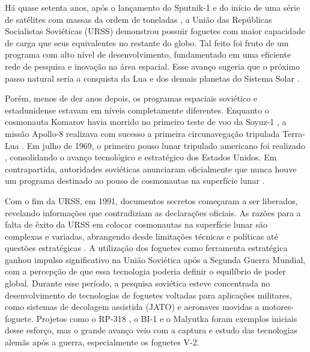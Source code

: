 Há quase setenta anos, após o lançamento do Sputnik-1 \citep{nasa1957} e do início de uma série de satélites com massas da ordem de toneladas \citep{sputnik3}, a União das Repúblicas Socialistas Soviéticas (URSS) demonstrou possuir foguetes com maior capacidade de carga que seus equivalentes no restante do globo. Tal feito foi fruto de um programa com alto nível de desenvolvimento, fundamentado em uma eficiente rede de pesquisa e inovação na área espacial. Esse avanço sugeria que o próximo passo natural seria a conquista da Lua e dos demais planetas do Sistema Solar \citep{betzler2024}.

Porém, menos de dez anos depois, os programas espaciais soviético e estadunidense estavam em níveis completamente diferentes. Enquanto o cosmonauta Komarov havia morrido no primeiro teste de voo da Soyuz-1 \citep{zak2018}, a missão Apollo-8 realizava com sucesso a primeira circunavegação tripulada Terra-Lua \citep{nasaApollo8}. Em julho de 1969, o primeiro pouso lunar tripulado americano foi realizado \citep{nasaApollo11}, consolidando o avanço tecnológico e estratégico dos Estados Unidos. Em contrapartida, autoridades soviéticas anunciaram oficialmente que nunca houve um programa destinado ao pouso de cosmonautas na superfície lunar \citep{betzler2024}.

Com o fim da URSS, em 1991, documentos secretos começaram a ser liberados, revelando informações que contradiziam as declarações oficiais. As razões para a falta de êxito da URSS em colocar cosmonautas na superfície lunar são complexas e variadas, abrangendo desde limitações técnicas e políticas até questões estratégicas \citep{betzler2024}. A utilização dos foguetes como ferramenta estratégica ganhou impulso significativo na União Soviética após a Segunda Guerra Mundial, com a percepção de que essa tecnologia poderia definir o equilíbrio de poder global. Durante esse período, a pesquisa soviética esteve concentrada no desenvolvimento de tecnologias de foguetes voltadas para aplicações militares, como sistemas de decolagem assistida (JATO) \citep{glushko1973} e aeronaves movidas a motores-foguete. Projetos como o RP-318 \citep{RP318}, o BI-1 \citep{BI1} e o Malyutka \citep{Malyutka} foram exemplos iniciais desse esforço, mas o grande avanço veio com a captura e estudo das tecnologias alemãs após a guerra, especialmente os foguetes V-2.

